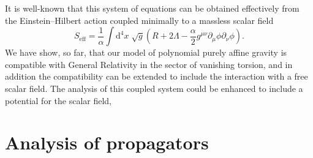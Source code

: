 \documentclass[aps,prd,12pt,twocolumn,superscriptaddress,showpacs,showkeys,reprint,longbibliography]{revtex4-1}
\newcommand\pa[1]{\partial_{{#1}}}
\renewcommand{\(}{\left(}
\renewcommand{\)}{\right)}
\renewcommand{\[}{\left[}
\renewcommand{\]}{\right]}
\newcommand{\dn}[2]{{\mathrm{d}}^{#1}{#2}\;}
\begin{document}
It is well-known that this system of equations can be obtained effectively from the Einstein--Hilbert action coupled minimally to a massless scalar field
\begin{equation}
  S_{\text{eff}} = \frac{1}{\alpha} \int \dn{4}{x} \sqrt{g} \left( R + 2 \Lambda - \frac{\alpha}{2} g^{\mu\nu} \pa{\mu}\phi \pa{\nu} \phi \right).
\end{equation}
We have show, so far, that our model of polynomial purely affine gravity is compatible with General Relativity in the sector of vanishing torsion, and in addition the compatibility can be extended to include the interaction with a free scalar field. The analysis of this coupled system could be enhanced to include a potential for the scalar field, 


\section{Analysis of propagators}
\end{document}
